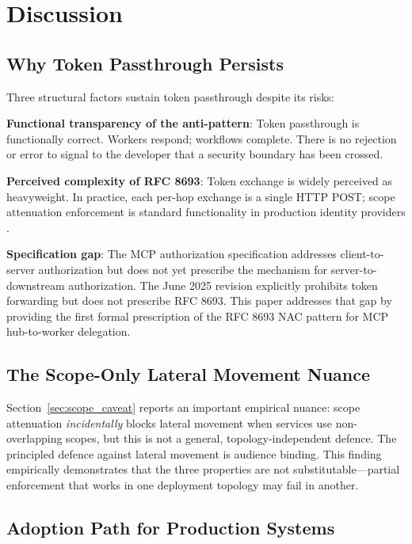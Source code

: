 \documentclass[journal]{IEEEtran}
\begin{document}
\section{Discussion}
\label{sec:discussion}

\subsection{Why Token Passthrough Persists}

Three structural factors sustain token passthrough despite its risks:

\textbf{Functional transparency of the anti-pattern}: Token passthrough is
functionally correct. Workers respond; workflows complete. There is no rejection
or error to signal to the developer that a security boundary has been crossed.

\textbf{Perceived complexity of RFC 8693}: Token exchange is widely perceived
as heavyweight. In practice, each per-hop exchange is a single HTTP POST;
scope attenuation enforcement is standard functionality in production identity
providers \cite{rfc8693_deploy}.

\textbf{Specification gap}: The MCP authorization specification
\cite{mcp_spec_2025} addresses client-to-server authorization but does not yet
prescribe the mechanism for server-to-downstream authorization. The June 2025
revision explicitly prohibits token forwarding but does not prescribe RFC 8693.
This paper addresses that gap by providing the first formal prescription of the
RFC 8693 NAC pattern for MCP hub-to-worker delegation.

\subsection{The Scope-Only Lateral Movement Nuance}

Section~\ref{sec:scope_caveat} reports an important empirical nuance: scope
attenuation \textit{incidentally} blocks lateral movement when services use
non-overlapping scopes, but this is not a general, topology-independent defence.
The principled defence against lateral movement is audience binding. This
finding empirically demonstrates that the three properties are not
substitutable---partial enforcement that works in one deployment topology may fail
in another.

\subsection{Adoption Path for Production Systems}
\end{document}
